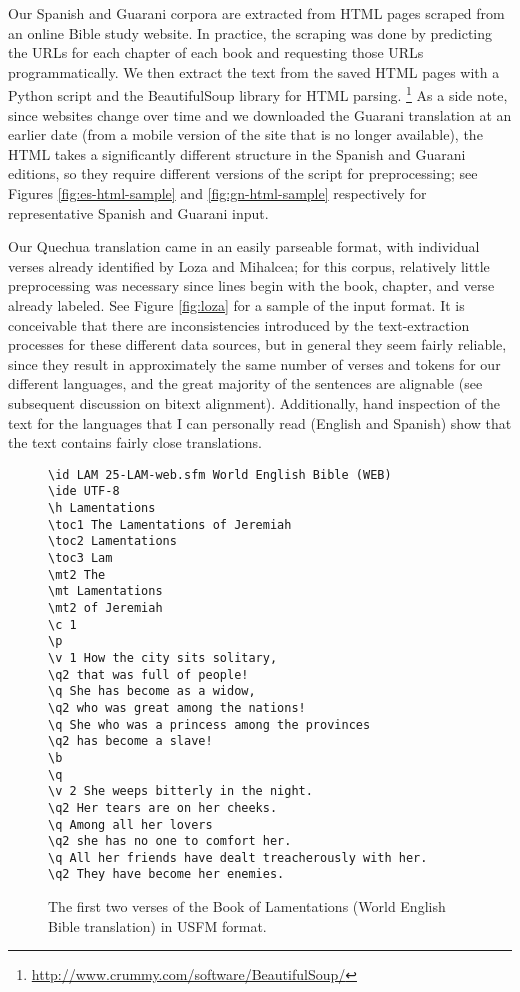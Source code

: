 Our Spanish and Guarani corpora are extracted from HTML pages scraped from an
online Bible study website. In practice, the scraping was done by predicting
the URLs for each chapter of each book and requesting those URLs
programmatically. We then extract the text from the saved HTML pages with a
Python script and the BeautifulSoup library for HTML parsing.
\footnote{\url{http://www.crummy.com/software/BeautifulSoup/}}
As a side note, since websites change over time and we
downloaded the Guarani translation at an earlier date (from a mobile version of
the site that is no longer available), the HTML takes a significantly different
structure in the Spanish and Guarani editions, so they require different
versions of the script for preprocessing; see Figures \ref{fig:es-html-sample}
and \ref{fig:gn-html-sample} respectively for representative Spanish and
Guarani input.

Our Quechua translation came in an easily parseable format, with individual
verses already identified by Loza and Mihalcea; for this corpus, relatively
little preprocessing was necessary since lines begin with the book, chapter,
and verse already labeled. See Figure \ref{fig:loza} for a sample of the input
format.
It is conceivable that there are inconsistencies introduced by the
text-extraction processes for these different data sources, but in general they
seem fairly reliable, since they result in approximately the same number of
verses and tokens for our different languages, and the great majority of the
sentences are alignable (see subsequent discussion on bitext alignment).
Additionally, hand inspection of the text for the languages that I can
personally read (English and Spanish) show that the text contains fairly close
translations.

\begin{figure*}
\raggedright \begin{verbatim}
\id LAM 25-LAM-web.sfm World English Bible (WEB) 
\ide UTF-8
\h Lamentations 
\toc1 The Lamentations of Jeremiah 
\toc2 Lamentations 
\toc3 Lam 
\mt2 The 
\mt Lamentations 
\mt2 of Jeremiah 
\c 1  
\p
\v 1 How the city sits solitary, 
\q2 that was full of people! 
\q She has become as a widow, 
\q2 who was great among the nations! 
\q She who was a princess among the provinces 
\q2 has become a slave! 
\b
\q
\v 2 She weeps bitterly in the night. 
\q2 Her tears are on her cheeks. 
\q Among all her lovers 
\q2 she has no one to comfort her. 
\q All her friends have dealt treacherously with her. 
\q2 They have become her enemies. 
\end{verbatim}
  \caption{The first two verses of the Book of Lamentations (World English
  Bible translation) in USFM format.}
  \label{fig:usfmsample}
\end{figure*}


